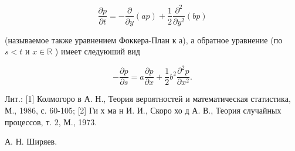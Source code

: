 \documentclass[10pt]{article}
\begin{document}
\[

\frac{\partial p}{\partial t}=-\frac{\partial}{\partial y}(a p)+\frac{1}{2} \frac{\partial^{2}}{\partial y^{2}}(b p)

\]



(называемое также уравнением Фоккера-План к а), а обратное уравнение (по $s<t$ и $x \in \mathbb{R}$ ) имеет следуюший вид



\[

-\frac{\partial p}{\partial s}=a \frac{\partial p}{\partial x}+\frac{1}{2} b^{2} \frac{\partial^{2} p}{\partial x^{2}} .

\]



Лит.: [1] Колмогоро в А. Н., Теория вероятностей и математическая статистика, М., 1986, с. 60-105; [2] Ги х ма н И. И., Скоро хо д А. В., Теория случайных процессов, т. 2, М., 1973.



А. Н. Ширяев.
\end{document}
